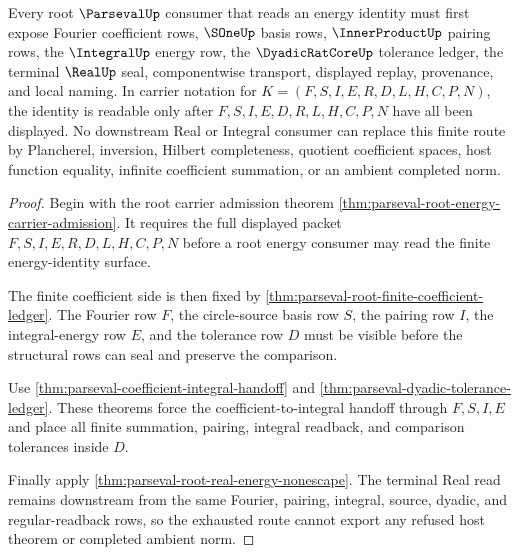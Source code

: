 \begin{theorem}
\label{thm:parseval-root-fourier-integral-energy-exhaustion}
Every root $\ParsevalUp$ consumer that reads an energy identity must first expose Fourier coefficient rows, $\SOneUp$ basis rows, $\InnerProductUp$ pairing rows, the $\IntegralUp$ energy row, the $\DyadicRatCoreUp$ tolerance ledger, the terminal $\RealUp$ seal, componentwise transport, displayed replay, provenance, and local naming. In carrier notation for $K=(F,S,I,E,R,D,L,H,C,P,N)$, the identity is readable only after $F,S,I,E,D,R,L,H,C,P,N$ have all been displayed. No downstream Real or Integral consumer can replace this finite route by Plancherel, inversion, Hilbert completeness, quotient coefficient spaces, host function equality, infinite coefficient summation, or an ambient completed norm.
\end{theorem}
\begin{proof}
Begin with the root carrier admission theorem \autoref{thm:parseval-root-energy-carrier-admission}. It requires the full displayed packet $F,S,I,E,R,D,L,H,C,P,N$ before a root energy consumer may read the finite energy-identity surface.

The finite coefficient side is then fixed by \autoref{thm:parseval-root-finite-coefficient-ledger}. The Fourier row $F$, the circle-source basis row $S$, the pairing row $I$, the integral-energy row $E$, and the tolerance row $D$ must be visible before the structural rows can seal and preserve the comparison.

Use \autoref{thm:parseval-coefficient-integral-handoff} and \autoref{thm:parseval-dyadic-tolerance-ledger}. These theorems force the coefficient-to-integral handoff through $F,S,I,E$ and place all finite summation, pairing, integral readback, and comparison tolerances inside $D$.

Finally apply \autoref{thm:parseval-root-real-energy-nonescape}. The terminal Real read remains downstream from the same Fourier, pairing, integral, source, dyadic, and regular-readback rows, so the exhausted route cannot export any refused host theorem or completed ambient norm.
\end{proof}

